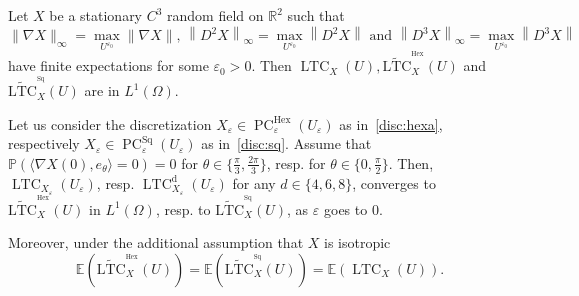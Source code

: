 \documentclass[10pt]{amsart}
\theoremstyle{definition}\newtheorem{defi}[theo]{Definition}\newtheorem{rema}[theo]{Remark}\newtheorem{exam}[theo]{Example}\newtheorem{exem}[theo]{Example}\newtheorem{nota}[theo]{Notation}
\newcommand{\R}{\mathbb{R}}
\newcommand{\bbP}{\mathbb{P}}
\newcommand{\E}{\mathbb{E}}
\newcommand{\eps}{\varepsilon}
\DeclareMathOperator{\LTC}{LTC}
\DeclareMathOperator{\PC}{PC}
\newcommand{\dd}{\mathrm{d}}
\DeclareMathOperator{\Hex}{Hex}
\DeclareMathOperator{\Sq}{Sq}
\newcommand{\tLTC}{\widetilde{\mathrm{LTC}}}
\begin{document}
\begin{prop}\label{cvgce:LTC}
Let $X$ be a stationary $C^3$ random field on $\R^2$ such that \[
\|\nabla X\|_\infty=\underset{U^{\eps_0}}{\max}\|\nabla X\|,\, \left\|D^2 X\right\|_\infty=\underset{U^{\eps_0}}{\max}\left\|D^2 X\right\|\text{ and }\left\|D^3 X\right\|_\infty=\underset{U^{\eps_0}}{\max}\left\|D^3 X\right\|
\]
have finite expectations for some $\eps_0>0$.
Then $\LTC_X(U), \tLTC^{^{\Hex}}_{X}(U)$ and $\tLTC^{^{\Sq}}_{X}(U)$ are in $L^1(\Omega)$.


Let us consider the discretization $X_\eps \in \PC_\eps^{\Hex}(U_\eps)$ as in~\eqref{disc:hexa}, respectively $X_\eps \in \PC_\eps^{\Sq}(U_\eps)$ as in~\eqref{disc:sq}. Assume that $\bbP(\langle \nabla X(0),e_\theta\rangle=0)=0$ for $\theta\in\{\tfrac{\pi}{3},\tfrac{2\pi}{3}\}$, resp. for $\theta\in\{0,\tfrac{\pi}{2}\}$. Then, $\LTC_{X_\eps}(U_\eps)$, resp. $\LTC^{\dd}_{X_\eps}(U_\eps)$ for any $d\in\{4,6,8\}$, converges to $\tLTC^{^{\Hex}}_{X}(U)$ in $L^1(\Omega)$, resp. to $\tLTC^{^{\Sq}}_{X}(U)$, as $\eps$ goes to $0$.


Moreover, under the additional assumption that $X$ is isotropic
\[
\E\left(\tLTC^{^{\Hex}}_{X}(U)\right) =\E\left(\tLTC^{^{\Sq}}_{X}(U)\right) =
\E\left(\LTC_{X}(U)\right).
\]
\end{prop}
\end{document}
